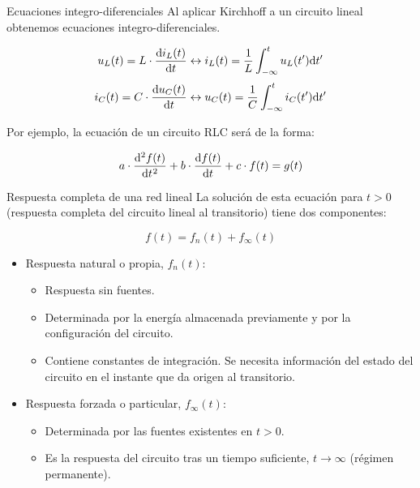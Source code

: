 \documentclass[aspectratio=169, usenames,svgnames,dvipsnames]{beamer}
\begin{document}
\begin{frame}[label={sec:orgf43e3e4}]{Ecuaciones integro-diferenciales}
Al aplicar Kirchhoff a un circuito lineal obtenemos ecuaciones integro-diferenciales. 

\[
  u_L(t) = L \cdot \diff{i_L(t)}{t}
  \leftrightarrow
  i_L(t) = \frac{1}{L} \int^t_{-\infty}u_L(t') \mathrm{d}t'
\]
\[
  i_C(t) = C \cdot \diff{u_C(t)}{t}
  \leftrightarrow
  u_C(t) = \frac{1}{C} \int^t_{-\infty}i_C(t') \mathrm{d}t'
\]

Por ejemplo, la ecuación de un circuito RLC será de la forma:

\[
  a \cdot \diff[2]{f(t)}{t} + b \cdot \diff{f(t)}{t} + c \cdot f(t) = g(t)
\]
\end{frame}
\begin{frame}[label={sec:orga7efe6a}]{Respuesta completa de una red lineal}
La solución de esta ecuación para \(t > 0\) (respuesta completa del circuito lineal al transitorio) tiene dos componentes:

\[
 \boxed{f(t) = f_n(t) + f_\infty(t) }
 \]

\begin{itemize}
\item Respuesta \alert{natural} o propia, \(f_n(t)\):
\begin{itemize}
\item Respuesta sin fuentes.
\item Determinada por la energía almacenada previamente y por la configuración del circuito.
\item Contiene constantes de integración. Se necesita información del estado del circuito en el instante que da origen al transitorio.
\end{itemize}
\item Respuesta \alert{forzada} o particular, \(f_\infty(t)\):
\begin{itemize}
\item Determinada por las fuentes existentes en \(t > 0\).
\item Es la respuesta del circuito tras un tiempo suficiente, \(t \to \infty\) (régimen permanente).
\end{itemize}
\end{itemize}
\end{frame}
\end{document}
